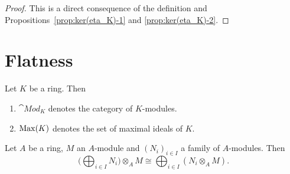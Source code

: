 \begin{proof}
    This is a direct consequence of the definition and Propositions~\ref{prop:ker(eta_K)-1} and \ref{prop:ker(eta_K)-2}.
\end{proof}

\section{Flatness}

\begin{ntns} Let\/ $K$ be a ring. Then
    \begin{enumerate}[-]
        \item $\cat{Mod}_K$ denotes the category of\/ $K$-modules.
        \item $\operatorname{Max}(K)$ denotes the set of maximal ideals of $K$.
    \end{enumerate}
\end{ntns}

\begin{prop}\label{prop:tensor-and-sum-commute}
    Let $A$ be a ring, $M$ an $A$-module and $(N_i)_{i\in I}$ a family of $A$-modules. Then
    $$
        \bigg(\bigoplus_{i\in I} N_i\bigg)\otimes_A M
            \cong\bigoplus_{i\in I}(N_i\otimes_A M).
    $$
\end{prop}

